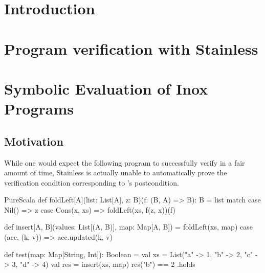 

\clearpage
\pagestyle{mystyle}

\section{Introduction}


%
%
%
%
%

\clearpage

\section{Program verification with Stainless}
\label{verif}



\clearpage
\section{Symbolic Evaluation of Inox Programs}
\label{symbolic}

\subsection{Motivation}

While one would expect the following program to successfully verify in a fair amount of time, Stainless is actually unable to automatically prove the verification condition corresponding to 's postcondition.

\begin{ShortCode}{PureScala}
def foldLeft[A](list: List[A], z: B)(f: (B, A) => B): B = list match {
  case Nil() => z
  case Cons(x, xs) => foldLeft(xs, f(z, x))(f)
}

def insert[A, B](values: List[(A, B)], map: Map[A, B]) = {
  foldLeft(xs, map) {
    case (acc, (k, v)) => acc.updated(k, v)
  }
}

def test(map: Map[String, Int]): Boolean = {
  val xs = List("a" -> 1, "b" -> 2, "c" -> 3, "d" -> 4)
  val res = insert(xs, map)
  res("b") == 2
}.holds
\end{ShortCode}

